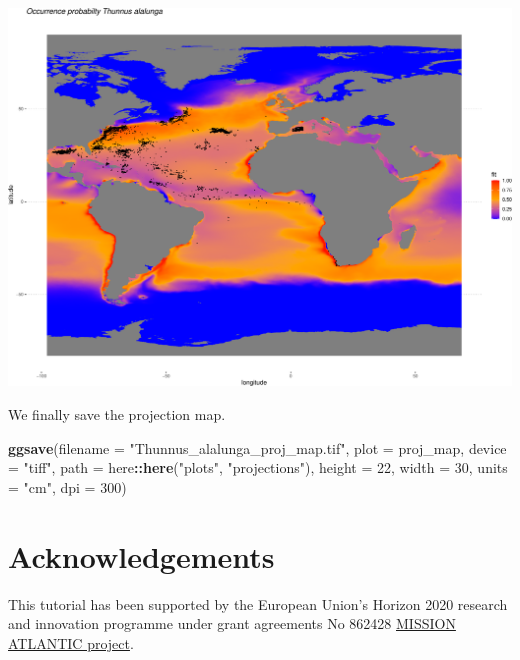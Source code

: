 \documentclass[
]{book}
\newenvironment{Shaded}{\begin{snugshade}}{\end{snugshade}}
\newcommand{\AttributeTok}[1]{\textcolor[rgb]{0.13,0.29,0.53}{#1}}
\newcommand{\DecValTok}[1]{\textcolor[rgb]{0.00,0.00,0.81}{#1}}
\newcommand{\FunctionTok}[1]{\textcolor[rgb]{0.13,0.29,0.53}{\textbf{#1}}}
\newcommand{\NormalTok}[1]{#1}
\newcommand{\SpecialCharTok}[1]{\textcolor[rgb]{0.81,0.36,0.00}{\textbf{#1}}}
\newcommand{\StringTok}[1]{\textcolor[rgb]{0.31,0.60,0.02}{#1}}
\begin{document}
\includegraphics{_main_files/figure-latex/unnamed-chunk-94-1.pdf}

We finally save the projection map.

\begin{Shaded}
\begin{Highlighting}[]
\FunctionTok{ggsave}\NormalTok{(}\AttributeTok{filename =} \StringTok{"Thunnus\_alalunga\_proj\_map.tif"}\NormalTok{,}
    \AttributeTok{plot =}\NormalTok{ proj\_map, }\AttributeTok{device =} \StringTok{"tiff"}\NormalTok{, }\AttributeTok{path =}\NormalTok{ here}\SpecialCharTok{::}\FunctionTok{here}\NormalTok{(}\StringTok{"plots"}\NormalTok{,}
        \StringTok{"projections"}\NormalTok{), }\AttributeTok{height =} \DecValTok{22}\NormalTok{, }\AttributeTok{width =} \DecValTok{30}\NormalTok{,}
    \AttributeTok{units =} \StringTok{"cm"}\NormalTok{, }\AttributeTok{dpi =} \DecValTok{300}\NormalTok{)}
\end{Highlighting}
\end{Shaded}

\chapter{Acknowledgements}\label{acknowledgements}

This tutorial has been supported by the European Union's Horizon 2020 research and innovation programme under grant agreements No 862428 \href{https://missionatlantic.eu/}{MISSION ATLANTIC project}.

  
\end{document}
